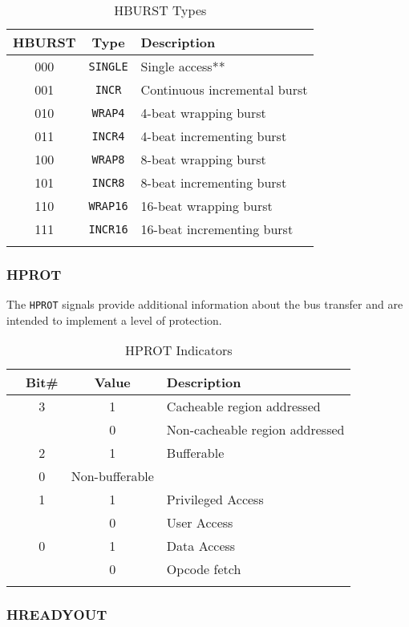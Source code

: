 \begin{longtable}[c]{@{\extracolsep{\fill}}ccl}	
		\toprule 
		\textbf{HBURST} & \textbf{Type} & \textbf{Description}\\
		\midrule
		\endhead 
		000 & \texttt{SINGLE} & Single access**\\
		001 & \texttt{INCR} & Continuous incremental burst\\
		010 & \texttt{WRAP4} & 4-beat wrapping burst\\
		011 & \texttt{INCR4} & 4-beat incrementing burst\\
		100 & \texttt{WRAP8} & 8-beat wrapping burst\\
		101 & \texttt{INCR8} & 8-beat incrementing burst\\
		110 & \texttt{WRAP16} & 16-beat wrapping burst\\
		111 & \texttt{INCR16} & 16-beat incrementing burst\\
		\bottomrule 	
	\caption{HBURST Types}
	\label{tab:HBURST}
\end{longtable}

\subsubsection{HPROT}

The \texttt{HPROT} signals provide additional information about the bus
transfer and are intended to implement a level of protection.

\begin{longtable}[c]{@{}lccl}	
		\toprule 
		& \textbf{Bit\#} & \textbf{Value} & \textbf{Description}\\
		\midrule
		\endhead 
		& 3 & 1 & Cacheable region addressed\\
		& & 0 & Non-cacheable region addressed\\
		& 2 & 1 & Bufferable\\
		& 0 & Non-bufferable\\
		& 1 & 1 & Privileged Access\\
		& & 0 & User Access\\
		& 0 & 1 & Data Access\\
		& & 0 & Opcode fetch\\
		\bottomrule 	
	\caption{HPROT Indicators}
	\label{tab:HPROT}
\end{longtable}

\subsubsection{HREADYOUT}

